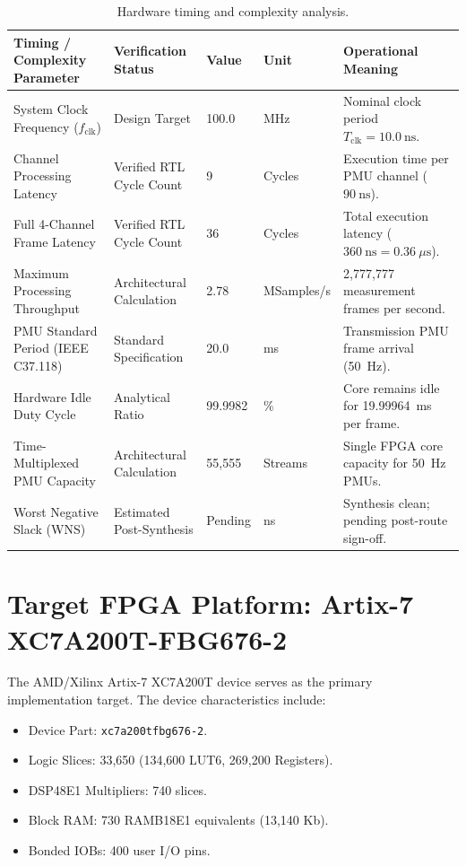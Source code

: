 \documentclass[11pt,a4paper]{report}
\begin{document}
\begin{table}[H]
\centering
\caption{Hardware timing and complexity analysis.}
\label{tab:hardware_timing}
\small
\renewcommand{\arraystretch}{1.25}
\begin{tabular}{|p{4.2cm}|p{3.2cm}|p{2.2cm}|p{1.8cm}|p{3.0cm}|}
\hline
\textbf{Timing / Complexity Parameter} & \textbf{Verification Status} & \textbf{Value} & \textbf{Unit} & \textbf{Operational Meaning} \\
\hline
System Clock Frequency ($f_{\text{clk}}$) & Design Target & 100.0 & MHz & Nominal clock period $T_{\text{clk}} = 10.0~\text{ns}$. \\
\hline
Channel Processing Latency & Verified RTL Cycle Count & 9 & Cycles & Execution time per PMU channel ($90~\text{ns}$). \\
\hline
Full 4-Channel Frame Latency & Verified RTL Cycle Count & 36 & Cycles & Total execution latency ($360~\text{ns} = 0.36~\mu\text{s}$). \\
\hline
Maximum Processing Throughput & Architectural Calculation & 2.78 & MSamples/s & 2,777,777 measurement frames per second. \\
\hline
PMU Standard Period (IEEE C37.118) & Standard Specification & 20.0 & ms & Transmission PMU frame arrival (50~Hz). \\
\hline
Hardware Idle Duty Cycle & Analytical Ratio & 99.9982 & \% & Core remains idle for 19.99964~ms per frame. \\
\hline
Time-Multiplexed PMU Capacity & Architectural Calculation & 55,555 & Streams & Single FPGA core capacity for 50~Hz PMUs. \\
\hline
Worst Negative Slack (WNS) & Estimated Post-Synthesis & Pending & ns & Synthesis clean; pending post-route sign-off. \\
\hline
\end{tabular}
\end{table}

\section{Target FPGA Platform: Artix-7 XC7A200T-FBG676-2}
The AMD/Xilinx Artix-7 XC7A200T device serves as the primary implementation target.
The device characteristics include:
\begin{itemize}
    \item Device Part: \texttt{xc7a200tfbg676-2}.
    \item Logic Slices: 33,650 (134,600 LUT6, 269,200 Registers).
    \item DSP48E1 Multipliers: 740 slices.
    \item Block RAM: 730 RAMB18E1 equivalents (13,140 Kb).
    \item Bonded IOBs: 400 user I/O pins.
\end{itemize}
\end{document}
